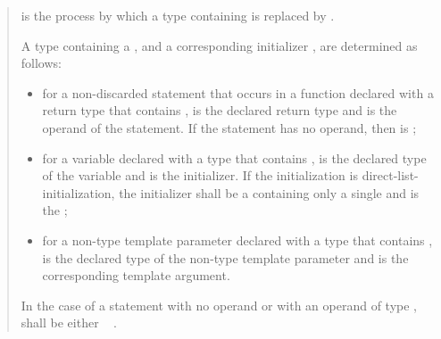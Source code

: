 \begin{quote}
\pnum
{} is the process by which a type containing
  is replaced by
 .

\pnum
A type  containing a ,
and a corresponding initializer ,
are determined as follows:

\begin{itemize}
\item
for a non-discarded  statement that occurs
in a function declared with a return type
that contains ,
 is the declared return type
and  is the operand of the  statement.
If the  statement
has no operand,
then  is ;
\item
for a variable declared with a type
that contains ,
 is the declared type of the variable
and  is the initializer.
If the initialization is direct-list-initialization,
the initializer shall be a 
containing only a single 
and  is the ;
\item
for a non-type template parameter declared with a type
that contains ,
 is the declared type of the non-type template parameter
and  is the corresponding template argument.
\end{itemize}
% 
In the case of a  statement with no operand
or with an operand of type ,
 shall be either
 \added{,} \cv{}~%
.



\end{quote}
